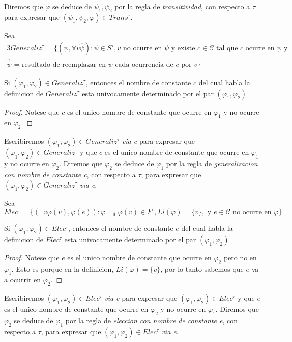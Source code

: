 \begin{definition}
  Diremos que $\varphi$ se deduce de $\psi_1,\psi_2$ por la regla de \emph{transitividad}, con respecto a $\tau$ para expresar que 
  $(\psi_1,\psi_2,\varphi) \in Trans^\tau$.

  Sea 
  \begin{alignat*}{3}
    Generaliz^\tau=\{(\psi,\forall v\hat\psi): \psi\in S^\tau, v \text{ no ocurre en $\psi$ y existe $c \in \mathcal{C}$ tal que $c$ ocurre en $\psi$ y} \\
    \text{$\hat\psi$ = resultado de reemplazar en $\psi$ cada ocurrencia de $c$ por $v$}\}
  \end{alignat*}

  \begin{lemma}
    Si $(\varphi_1,\varphi_2) \in Generaliz^\tau$, entonces el nombre de constante $c$ del cual habla la definicion de $Generaliz^\tau$ esta univocamente determinado
    por el par $(\varphi_1,\varphi_2)$
  \end{lemma}
  \begin{proof}
    Notese que $c$ es el unico nombre de constante que ocurre en $\varphi_1$ y no ocurre en $\varphi_2$.
  \end{proof}

  Escribiremos $(\varphi_1,\varphi_2)\in Generaliz^\tau$ \emph{via c} para expresar que $(\varphi_1,\varphi_2) \in Generaliz^\tau$ y que $c$
  es el unico nombre de constante que ocurre en $\varphi_1$ y no ocurre en $\varphi_2$. Diremos que $\varphi_2$ se deduce de $\varphi_1$ por la regla de  \emph{generalizacion con nombre de constante c},
  con respecto a $\tau$, para expresar que $(\varphi_1,\varphi_2)\in Generaliz^\tau$ \emph{via c}.

  Sea 
  $$
  Elec^\tau = \{(\exists v\varphi(v), \varphi(e)):\varphi =_d \varphi(v)\in F^\tau, Li(\varphi) =\{v\}, \text{ y } e\in \mathcal{C} \text{ no ocurre en }\varphi\}
  $$

  \begin{lemma}
    Si $(\varphi_1,\varphi_2) \in Elec^\tau$, entonces el nombre de constante $e$ del cual habla la definicion de $Elec^\tau$
    esta univocamente determinado por el par $(\varphi_1,\varphi_2)$
  \end{lemma}
  \begin{proof}
    Notese que $e$ es el unico nombre de constante que ocurre en $\varphi_2$ pero no en $\varphi_1$. Esto es porque en la definicion, $Li(\varphi) = \{v\}$,
    por lo tanto sabemos que $e$ va a ocurrir en $\varphi_2$.
  \end{proof}

  Escribiremos $(\varphi_1,\varphi_2)\in Elec^\tau$ \emph{via e} para expresar que $(\varphi_1,\varphi_2) \in Elec^\tau$ y que $e$
  es el unico nombre de constante que ocurre en $\varphi_2$ y no ocurre en $\varphi_1$. Diremos que $\varphi_2$ se deduce de $\varphi_1$ por la regla de  \emph{eleccion con nombre de constante e},
  con respecto a $\tau$, para expresar que $(\varphi_1,\varphi_2)\in Elec^\tau$ \emph{via e}.
\end{definition}

